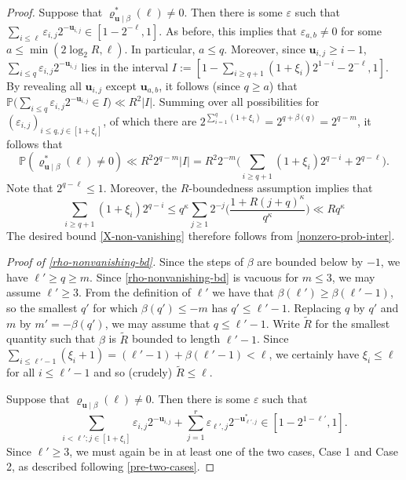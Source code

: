 \documentclass[11pt,reqno]{amsart}
\numberwithin{equation}{section}
\theoremstyle{definition}
\theoremstyle{remark}
\newcommand{\mb}{\mathbb}
\newcommand{\mbf}{\mathbf}
\newcommand{\eps}{\varepsilon}
\renewcommand{\le}{\leqslant}
\renewcommand{\ge}{\geqslant}
\begin{document}
\begin{proof}
Suppose that $\varrho^*_{\mbf{u} \mid \beta}(\ell) \ne 0$. Then there is some $\eps$ such that $\sum_{i \le \ell} \eps_{i,j} 2^{-\mbf{u}_{i,j}} \in [1 - 2^{-\ell},1]$. As before, this implies that $\eps_{a,b} \ne 0$ for some $a \le \min(2\log_2 R, \ell)$. In particular, $a \le q$. Moreover, since $\mbf{u}_{i,j} \ge i - 1$, $\sum_{i \le q} \eps_{i,j} 2^{-\mbf{u}_{i,j}}$ lies in the interval $I := [1 - \sum_{i \ge q + 1} (1 + \xi_i) 2^{1-i} - 2^{-\ell} ,    1 ]$. By revealing all $\mbf{u}_{i,j}$ except $\mbf{u}_{a,b}$, it follows (since $q \ge a$) that $\mb{P}\big( \sum_{i \le q} \eps_{i,j} 2^{-\mbf{u}_{i,j}} \in I\big) \ll 
R^2|I|$. Summing over all possibilities for $(\eps_{i,j})_{i \le q, j \in [1+\xi_i]}$, of which there are $2^{\sum_{i =1}^q (1 + \xi_i)} = 2^{q + \beta(q)} = 2^{q - m}$, it follows that 
\begin{equation}\label{nonzero-prob-inter} \mb{P}(\varrho^*_{\mbf{u} \mid \beta}(\ell) \ne 0) \ll R^2 2^{q - m}|I| = R^2 2^{-m} \big( \sum_{i \ge q +1} (1 + \xi_i) 2^{q - i} + 2^{q - \ell}\big).\end{equation}
Note that $2^{q - \ell} \le 1$. Moreover, the $R$-boundedness assumption implies that
\begin{equation}\label{r-boundedness-q} \sum_{i \ge q+1} (1 + \xi_{i}) 2^{q- i} \le q^{\kappa}  \sum_{j \ge 1}2^{-j} \Big( \frac{1 + R(j + q)^{\kappa}}{q^{\kappa}} \Big) \ll Rq^{\kappa} \end{equation} 
The desired bound \cref{X-non-vanishing} therefore follows from \cref{nonzero-prob-inter}.\vspace*{8pt}

\emph{Proof of \cref{rho-nonvanishing-bd}.} Since the steps of $\beta$ are bounded below by $-1$, we have $\ell' \ge q \ge m$. Since \cref{rho-nonvanishing-bd} is vacuous for $m \le 3$, we may assume $\ell' \ge 3$. From the definition of $\ell'$ we have that $\beta(\ell') \ge \beta(\ell' - 1)$, so the smallest $q'$ for which $\beta(q') \le -m$ has $q' \le \ell' - 1$. Replacing $q$ by $q'$ and $m$ by $m' = -\beta(q')$, we may assume that $q \le \ell' - 1$. Write $\tilde R$ for the smallest quantity such that $\beta$ is $\tilde R$ bounded to length $\ell' - 1$. Since $\sum_{i \le \ell'-1} (\xi_i + 1) = (\ell' - 1) + \beta(\ell' - 1) < \ell$, we certainly have $\xi_i \le \ell$ for all $i \le \ell' - 1$ and so (crudely) $\tilde R \le \ell$. 

Suppose that $\varrho_{\mbf{u} \mid \beta}(\ell) \ne 0$. Then there is some $\eps$ such that 
\begin{equation}\label{state-rho} \sum_{i < \ell'; j \in [1 + \xi_i]} \eps_{i,j} 2^{-\mbf{u}_{i,j}} + \sum_{j = 1}^r \eps_{\ell', j} 2^{-\mbf{u}^*_{\ell', j}} \in [1 - 2^{1 - \ell'},1].\end{equation} Since $\ell' \ge 3$, we must again be in at least one of the two cases, Case 1 and Case 2, as described following \cref{pre-two-cases}.


\end{proof}
\end{document}
